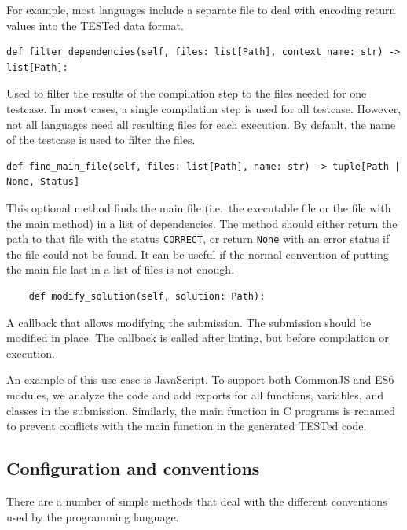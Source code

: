 \documentclass[../main]{subfiles}
\begin{document}
For example, most languages include a separate file to deal with encoding return values into the TESTed data format.

\begin{verbatim}
def filter_dependencies(self, files: list[Path], context_name: str) -> list[Path]:
\end{verbatim}

Used to filter the results of the compilation step to the files needed for one testcase.
In most cases, a single compilation step is used for all testcase.
However, not all languages need all resulting files for each execution.
By default, the name of the testcase is used to filter the files.

\begin{verbatim}
def find_main_file(self, files: list[Path], name: str) -> tuple[Path | None, Status]
\end{verbatim}

This optional method finds the main file (i.e.\ the executable file or the file with the main method) in a list of dependencies.
The method should either return the path to that file with the status \texttt{CORRECT}, or return \texttt{None} with an error status if the file could not be found.
It can be useful if the normal convention of putting the main file last in a list of files is not enough.

\begin{verbatim}
    def modify_solution(self, solution: Path):
\end{verbatim}

A callback that allows modifying the submission.
The submission should be modified in place.
The callback is called after linting, but before compilation or execution.

An example of this use case is JavaScript.
To support both CommonJS and ES6 modules, we analyze the code and add exports for all functions, variables, and classes in the submission.
Similarly, the main function in C programs is renamed to prevent conflicts with the main function in the generated TESTed code.

\subsection{Configuration and conventions}\label{subsec:configuration-and-conventions}

There are a number of simple methods that deal with the different conventions used by the programming language.
\end{document}
